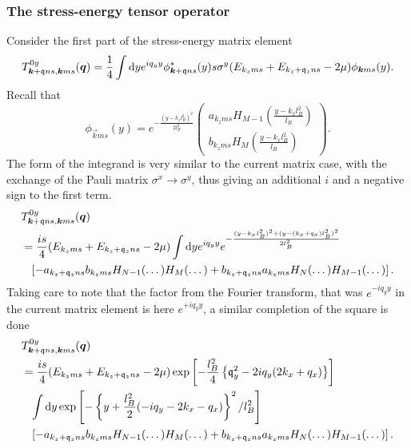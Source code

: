 \subsubsection{The stress-energy tensor operator}
Consider the first part of the stress-energy matrix element
\begin{equation}
\label{eq:75}
T^{0y}_{\bm{k}+\mathfrak{q}ns, \bm{k}ms} (\bm{q})
=
\frac{1}{4}
\int \mathrm{d}y e^{iq_y y}
\phi ^* _{\bm{k}+\mathfrak{q} ns}(y) s \sigma ^y (E_{k_z m s} + E_{k_z+\mathfrak{q}_z n s}- 2\mu )
\phi _{\bm{k} ms}(y).
\end{equation}
Recall that 
\begin{equation}
  \phi _{\vec{k}ms}(y) =
  e^{- \frac{(y - k_x l_B ^2)^2}{2 l_B^2}}
  \begin{pmatrix}
    a_{k_z ms} H_{M-1} \left( \frac{y-k_x l_B^2}{l_B} \right)\\
    b_{k_z ms} H_M \left( \frac{y - k_x l_B^2}{l_B} \right)
  \end{pmatrix}.
\end{equation}
The form of the integrand is very similar to the current matrix case, with the exchange of the Pauli matrix $\sigma ^x \to \sigma ^y$, thus giving an additional $i$ and a negative sign to the first term.
\begin{align}
&T^{0y}_{\bm{k}+\mathfrak{q}ns, \bm{k}ms} (\bm{q})\\
  \nonumber &= \frac{i s}{4}
    (E_{k_z m s} + E_{k_z+\mathfrak{q}_z n s}- 2\mu )
    \int \mathrm{d}y e^{iq_y y} e^{- \frac{(y-k_xl_B^2)^2 + (y-(k_x + q_x) l_B^2)^2}{2 l_B^2}}\\
    \nonumber & \phantom{=} \left[
    - a_{k_z+\mathfrak{q}_z ns} b_{k_z ms} H_{N-1} (\dots ) H_M(\dots )
    + b_{k_z+\mathfrak{q}_z ns} a_{k_zms} H_N(\dots ) H_{M-1}(\dots )
    \right].
\end{align}
Taking care to note that the factor from the Fourier transform, that was $e^{-iq_y y}$ in the current matrix element is here $e^{+ i q_y y}$, a similar completion of the square is done 
\begin{equation}
  \begin{split}
    &T^{0y}_{\bm{k}+\mathfrak{q}ns, \bm{k}ms} (\bm{q})\\
    &=
    \frac{i s}{4}
    (E_{k_z m s} + E_{k_z+\mathfrak{q}_z n s}- 2\mu )
    \exp \left[
      -\frac{l_B^2}{4} \left\{ \mathfrak{q}_y^2 - 2 i q_y (2 k_x + q_x) \right\}
    \right]\\
    &\phantom{=} \int \mathrm{d}y
    \exp \left[
      -\left\{ y + \frac{l_B^2}{2} (-iq_y - 2 k_x - q_x) \right\}^2 / l_B^2
    \right]\\
    &\phantom{=} \left[
      - a_{k_z+\mathfrak{q}_z ns} b_{k_z ms} H_{N-1} (\dots ) H_M(\dots )
      + b_{k_z+\mathfrak{q}_z ns} a_{k_zms} H_N(\dots ) H_{M-1}(\dots )
    \right].
  \end{split}
\end{equation}
